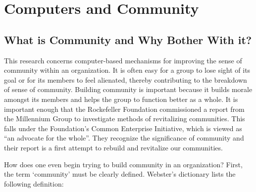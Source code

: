 
\chapter{Computers and Community}
\label{chap:introduction}



\section{What is Community and Why Bother With it?}
This research concerns computer-based mechanisms for improving the
sense of community within an organization.  It is often easy for a group to
lose sight of its goal or for its members to feel alienated, thereby
contributing to the breakdown of sense of community.  Building community is
important because it builds morale amongst its members and helps the group to
function better as a whole.  It is important enough that the Rockefeller
Foundation commissioned a report \cite{Sharp94} from the Millennium Group to
investigate methods of revitalizing communities.  This falls under the
Foundation's Common Enterprise Initiative, which is viewed as ``an advocate for
the whole''.  They recognize the significance of community and their report is
a first attempt to rebuild and revitalize our communities.

How does one even begin trying to build community in an organization?  First,
the term `community' must be clearly defined.  Webster's dictionary
\cite{Webster84} lists the following definition:

